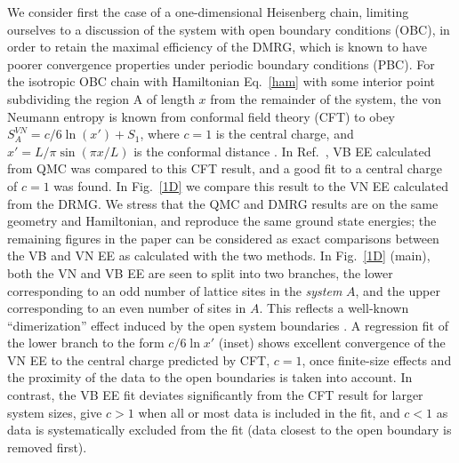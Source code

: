 \documentclass[prl,aps,twocolumn,floatfix,amsmath,amssymb,superscriptaddress,tightenlines]{revtex4}
\begin{document}
We consider first the case of a one-dimensional Heisenberg chain, limiting ourselves to a discussion of the system with open boundary conditions (OBC), in order to retain the maximal efficiency of the DMRG, which is known to have poorer convergence properties under periodic boundary conditions (PBC).  For the isotropic OBC chain with Hamiltonian Eq.~\eqref{ham} with some interior point subdividing the region A of length $x$ from the remainder of the system, the von Neumann entropy is known from conformal field theory (CFT) to obey $S^{VN}_A = c/6 \ln(x') + S_1$, where $c=1$ is the central charge, and $x'=L/\pi \sin(\pi x / L)$ is the conformal distance \cite{Cardy}.
In Ref.~\cite{Alet}, VB EE calculated from QMC was compared to this CFT result, and a good fit to a central charge of $c=1$ was found.  In Fig.~\ref{1D} we compare this result to the VN EE calculated from the DRMG.  We stress that the QMC and DMRG results are on the same geometry and Hamiltonian, and reproduce the same ground state energies; the remaining figures in the paper can be considered as exact comparisons between the VB and VN EE as calculated with the two methods.  In Fig.~\ref{1D} (main), both the VN and VB EE are seen to split into two branches, the lower corresponding to an odd number of lattice sites in the {\it system} $A$, and the upper corresponding to an even number of sites in $A$.  This reflects a well-known ``dimerization'' effect induced by the open system boundaries \cite{Ian1}.  A regression fit of the lower branch to the form $c/6 \ln {x'}$ (inset) shows excellent convergence of the VN EE to the central charge predicted by CFT, $c=1$, once finite-size effects and the proximity of the data to the open boundaries is taken into account.  In contrast, the VB EE fit deviates significantly from the CFT result for larger system sizes, give $c>1$ when all or most data is included in the fit, and $c<1$ as data is systematically excluded from the fit (data closest to the open boundary is removed first).  


\end{document}
